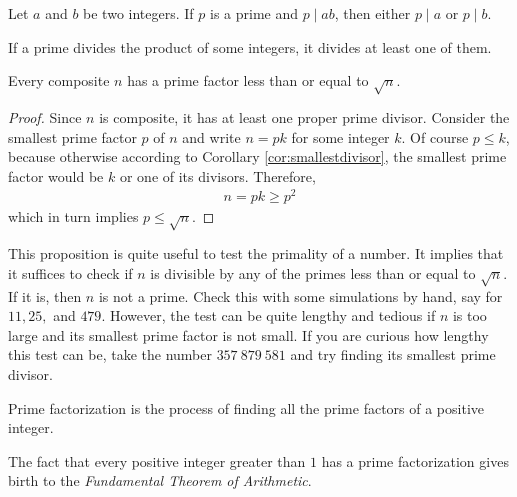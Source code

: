 \begin{proposition}\label{prop:euclidslemma}
	Let $a$ and $b$ be two integers. If $p$ is a prime and $p\mid ab$, then either $p\mid a$ or $p\mid b$.
\end{proposition}

\begin{corollary}\label{cor:euclidgeneral}
	If a prime divides the product of some integers, it divides at least one of them.
\end{corollary}

\begin{proposition}\label{factorsqrt}
	Every composite $n$ has a prime factor less than or equal to $\sqrt{n}$.
\end{proposition}

\begin{proof}
	Since $n$ is composite, it has at least one proper prime divisor. { Consider the smallest prime factor $p$ of $n$} and write $n=pk$ for some integer $k$. Of course $p\leq k$, because otherwise according to Corollary \eqref{cor:smallestdivisor}, the smallest prime factor would be $k$ or one of its divisors. Therefore,
	\begin{align*}
		n=pk\geq p^2
	\end{align*}
	which in turn implies $p\leq \sqrt{n}$.
\end{proof}

This proposition is quite useful to test the primality of a number. It implies that it suffices to check if $n$ is divisible by any of the primes less than or equal to $\sqrt{n}$. If it is, then $n$ is not a prime. Check this with some simulations by hand, say for $11,25,$ and $479$. However, the test can be quite lengthy and tedious if $n$ is too large and its smallest prime factor is not small. If you are curious how lengthy this test can be, take the number $357 \ 879 \ 581$ and try finding its smallest prime divisor.

\begin{definition}
	Prime factorization is the process of finding all the prime factors of a positive integer.
\end{definition}

The fact that every positive integer greater than $1$ has a prime factorization gives birth to the \textit{Fundamental Theorem of Arithmetic}.

